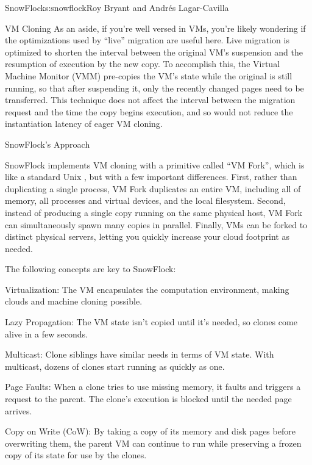 \begin{aosachapter}{SnowFlock}{s:snowflock}{Roy Bryant and Andr\'e{s} Lagar-Cavilla}
\begin{aosasect1}{VM Cloning}
As an aside, if you're well versed in VMs, you're likely wondering if
the optimizations used by ``live'' migration are useful here. Live
migration is optimized to shorten the interval between the original
VM's suspension and the resumption of execution by the new copy.  To
accomplish this, the Virtual Machine Monitor (VMM) pre-copies the VM's state while the original
is still running, so that after suspending it, only the recently
changed pages need to be transferred. This technique does not affect
the interval between the migration request and the time the copy
begins execution, and so would not reduce the instantiation latency of
eager VM cloning.

\end{aosasect1}

\begin{aosasect1}{SnowFlock's Approach}

SnowFlock implements VM cloning with a primitive called ``VM Fork'',
which is like a standard Unix , but with a few
important differences.  First, rather than duplicating a single
process, VM Fork duplicates an entire VM, including all of memory, all
processes and virtual devices, and the local filesystem.  Second,
instead of producing a single copy running on the same physical host,
VM Fork can simultaneously spawn many copies in parallel. Finally, VMs
can be forked to distinct physical servers, letting you quickly
increase your cloud footprint as needed.

The following concepts are key to SnowFlock:

\begin{aosaitemize}

  \item Virtualization: The VM encapsulates the computation
  environment, making clouds and machine cloning possible.

  \item Lazy Propagation: The VM state isn't copied until it's needed,
  so clones come alive in a few seconds.

  \item Multicast: Clone siblings have similar needs in terms of VM
  state. With multicast, dozens of clones start running as quickly
  as one.

  \item Page Faults: When a clone tries to use missing memory, it
  faults and triggers a request to the parent. The clone's execution
  is blocked until the needed page arrives.

  \item Copy on Write (CoW): By taking a copy of its memory and disk
  pages before overwriting them, the parent VM can continue to run
  while preserving a frozen copy of its state for use by the clones.


\end{aosaitemize}
\end{aosasect1}
\end{aosachapter}
